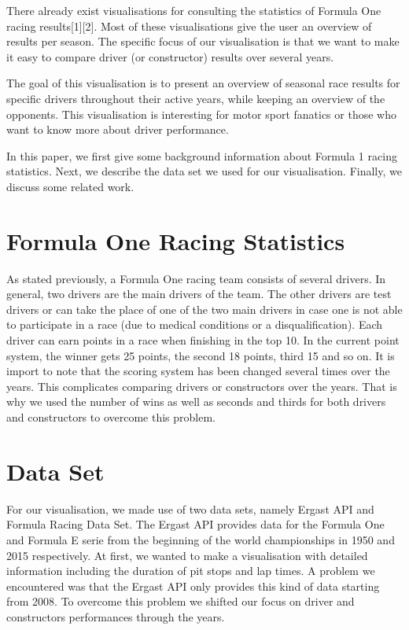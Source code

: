 \documentclass{sigchi}
\begin{document}
There already exist visualisations for consulting the statistics of Formula One racing results[1][2]. Most of these visualisations give the user an overview of results per season. The specific focus of our visualisation is that we want to make it easy to compare driver (or constructor) results over several years.

The goal of this visualisation is to present an overview of seasonal race results for specific drivers throughout their active years, while keeping an overview of the opponents. This visualisation is interesting for motor sport fanatics or those who want to know more about driver performance.

In this paper, we first give some background information about Formula 1 racing statistics. Next, we describe the data set we used for our visualisation. Finally, we discuss some related work. 


\section{Formula One Racing Statistics}

As stated previously, a Formula One racing team consists of several drivers. In general, two drivers are the main drivers of the team. The other drivers are test drivers or can take the place of one of the two main drivers in case one is not able to participate in a race (due to medical conditions or a disqualification). Each driver can earn points in a race when finishing in the top 10. In the current point system, the winner gets 25 points, the second 18 points, third 15 and so on. It is import to note that the scoring system has been changed several times over the years. This complicates comparing drivers or constructors over the years. That is why we used the number of wins as well as seconds and thirds for both drivers and constructors to overcome this problem.

\section{Data Set}

For our visualisation, we made use of two data sets, namely Ergast API and Formula Racing Data Set. The Ergast API provides data for the Formula One and Formula E serie from the beginning of the world championships in 1950 and 2015 respectively. At first, we wanted to make a visualisation with detailed information including the duration of pit stops and lap times. A problem we encountered was that the Ergast API only provides this kind of data starting from 2008. To overcome this problem we shifted our focus on driver and constructors performances through the years.
\end{document}
